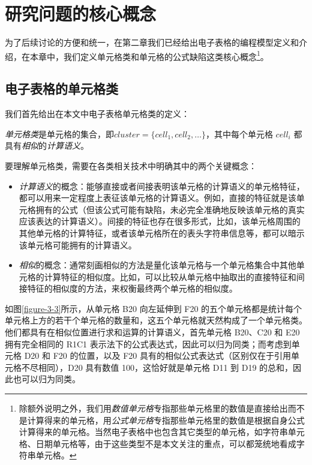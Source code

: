 \chapter{研究问题的核心概念}
为了后续讨论的方便和统一，在第二章我们已经给出电子表格的编程模型定义和介绍，在本章中，我们定义单元格类和单元格的公式缺陷这类核心概念\footnote{除额外说明之外，我们用\textit{数值单元格}专指那些单元格里的数值是直接给出而不是计算得来的单元格，用\textit{公式单元格}专指那些单元格里的数值是根据自身公式计算得来的单元格。当然电子表格中也包含其它类型的单元格，如字符串单元格、日期单元格等，由于这些类型不是本文关注的重点，可以都笼统地看成字符串单元格。}。


\section{电子表格的单元格类}


我们首先给出在本文中电子表格单元格类的定义：

\begin{definition}
    \textit{单元格类}是单元格的集合，即$cluster = \{cell_1, cell_2, \dots\}$，其中每个单元格 $cell_i$ 都具有\textit{相似}的\textit{计算语义}。
\end{definition}

要理解单元格类，需要在各类相关技术中明确其中的两个关键概念：

\begin{itemize}
    \item \textit{计算语义}的概念：能够直接或者间接表明该单元格的计算语义的单元格特征，都可以用来一定程度上表征该单元格的计算语义。例如，直接的特征就是该单元格拥有的公式（但该公式可能有缺陷，未必完全准确地反映该单元格的真实应该表达的计算语义）。间接的特征也存在很多形式，比如，该单元格周围的其他单元格的计算特征，或者该单元格所在的表头字符串信息等，都可以暗示该单元格可能拥有的计算语义。
    \item \textit{相似}的概念：通常刻画相似的方法是量化该单元格与一个单元格集合中其他单元格的计算特征的相似度。比如，可以比较从单元格中抽取出的直接特征和间接特征的相似度的方法，来权衡最终两个单元格的相似度。
\end{itemize}

如图\ref{figure-3-3}所示，从单元格 B20 向左延伸到 F20 的五个单元格都是统计每个单元格上方的若干个单元格的数量和，这五个单元格就天然构成了一个单元格类。他们都具有在相似位置进行求和运算的计算语义，首先单元格 B20、C20 和 E20 拥有完全相同的 R1C1 表示法下的公式表达式，因此可以归为同类；而考虑到单元格 D20 和 F20 的位置，以及 F20 具有的相似公式表达式（区别仅在于引用单元格不尽相同），D20 具有数值 100，这恰好就是单元格 D11 到 D19 的总和，因此也可以归为同类。

